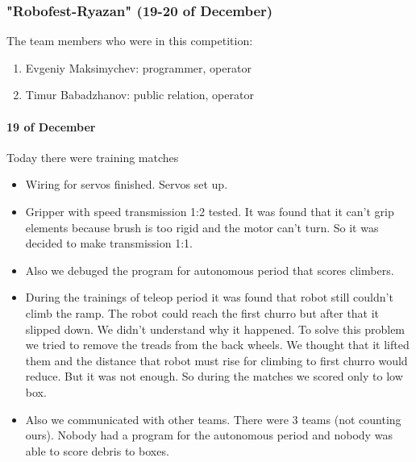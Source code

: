 \subsubsection{"Robofest-Ryazan" (19-20 of December)}
The team members who were in this competition:
\begin{enumerate}
	\item Evgeniy Maksimychev: programmer, operator 
	
	\item Timur Babadzhanov: public relation, operator 
\end{enumerate}
\paragraph{19 of December}
Today there were training matches
\begin{itemize}
	\item Wiring for servos finished. Servos set up.
	
	\item Gripper with speed transmission 1:2 tested. It was found that it can't grip elements because brush is too rigid and the motor can't turn. So it was decided to make transmission 1:1.
	
	\item Also we debuged the program for autonomous period that scores climbers.
	
	\item During the trainings of teleop period it was found that robot still couldn't climb the ramp. The robot could reach the first churro but after that it slipped down. We didn't understand why it happened. To solve this problem we tried to remove the treads from the back wheels. We thought that it lifted them and the distance that robot must rise for climbing to first churro would reduce. But it was not enough. So during the matches we scored only to low box.
	
	\item Also we communicated with other teams. There were 3 teams (not counting ours). Nobody had a program for the autonomous period and nobody was able to score debris to boxes.
\end{itemize}
